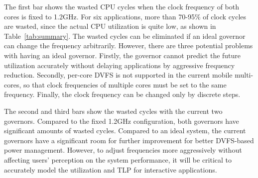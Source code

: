 The first bar shows the wasted CPU cycles when the clock frequency of both cores is fixed to
1.2GHz. For six applications, more than 70-95\% of clock cycles are wasted, since the actual
CPU utilization is quite low, as shown in Table~\ref{tab:summary}. 
The wasted cycles can be eliminated if an ideal governor can change the frequency arbitrarily. 
However, there are three potential problems with having an ideal governor. Firstly,
the governor cannot predict the future utilization accurately without delaying applications
by aggressive frequency reduction. Secondly, per-core DVFS is not supported in the current
mobile multi-cores, so that clock frequencies
of multiple cores must be set to the same frequency. Finally, the clock frequency can be changed
only by discrete steps.

The second and third bars show the wasted cycles with the current two governors. 
Compared to the fixed 1.2GHz configuration, both governors have significant amounts of
wasted cycles. Compared to an ideal system, the current governors have a significant room for further 
improvement for better DVFS-based power management. However, to adjust frequencies more aggressively
without affecting users' perception on the system performance, it will be 
critical to accurately model the utilization and TLP for interactive applications. 